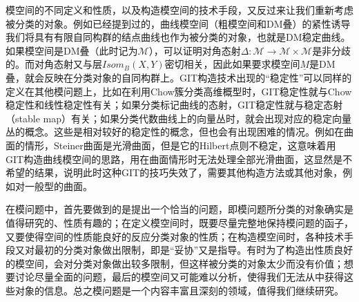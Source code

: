 模空间的不同定义和性质，以及构造模空间的技术手段，又反过来让我们重新考虑被分类的对象。例如已经提到过的，曲线模空间（粗模空间和DM叠）的紧性诱导我们将具有有限自同构群的结点曲线也作为被分类的对象，也就是DM稳定曲线。如果模空间是DM叠（此时记为$ \mathscr{M} $），可以证明对角态射$ \Delta:\mathscr{M}\to \mathscr{M}\times \mathscr{M} $是非分歧的。而对角态射又与层$  Isom_B(X,Y) $密切相关，因此如果要求模空间$ \underline{M} $是DM叠，就会反映在分类对象的自同构群上。GIT构造技术出现的“稳定性”可以同样的定义在其他模问题上，比如在利用Chow簇分类高维概型时，GIT稳定性就与Chow稳定性和线性稳定性有关；如果分类标记曲线的态射，GIT稳定性就与稳定态射（stable map）有关；如果分类代数曲线上的向量丛时，就会出现对应的稳定向量丛的概念。这些是相对较好的稳定性的概念，但也会有出现困难的情况。例如在曲面的情形，Steiner曲面是光滑曲面，但是它的Hilbert点则不稳定，这意味着用GIT构造曲线模空间的思路，用在曲面情形时无法处理全部光滑曲面，这显然是不希望的结果，说明此时这种GIT的技巧失效了，需要其他构造方法或其他对象，例如对一般型的曲面。

在模问题中，首先要做到的是提出一个恰当的问题，即模问题所分类的对象确实是值得研究的、性质有趣的；在定义模空间时，既要尽量完整地保持模问题的函子，又要使得空间的性质能良好的反应分类对象的性质；在构造模空间时，各种技术手段又对最初的分类对象做出限制，即是“妥协”又是指导。有时为了构造出性质良好的模空间，会对分类对象做出较多限制，但这样被分类的对象太少而没有价值；想要讨论尽量全面的问题，最后的模空间又可能难以分析，使得我们无法从中获得这些对象的信息。总之模问题是一个内容丰富且深刻的领域，值得我们继续研究。